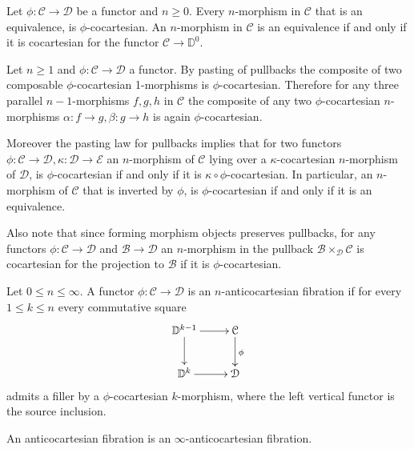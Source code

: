 \documentclass[10pt,oneside]{article}
\numberwithin{equation}{section} %
\numberwithin{figure}{section} %
\theoremstyle{plain}
\theoremstyle{definition}
\newcommand{\bD}{{\mathbb D}}
\newcommand{\mB}{{\mathcal B}}
\newcommand{\mC}{{\mathcal C}}
\newcommand{\mD}{{\mathcal D}}
\newcommand{\mE}{{\mathcal E}}
\begin{document}
\begin{example}Let $\phi: \mC \to \mD$ be a functor and $n \geq 0$.
Every $n$-morphism in $\mC$ that is an equivalence, is $\phi$-cocartesian.
An $n$-morphism in $\mC$ is an equivalence if and only if it is 
cocartesian for the functor $\mC \to \bD^0$.
    
\end{example}

\begin{remark}\label{elemen}
Let $n \geq 1$ and $\phi: \mC \to \mD$ a functor.
By pasting of pullbacks the composite of two composable $\phi$-cocartesian 1-morphisms is $\phi$-cocartesian.
Therefore for any three parallel $n-1$-morphisms $f,g,h$ in $\mC$
the composite of any two $\phi$-cocartesian $n$-morphisms $\alpha : f \to g, \beta: g \to h$ is again $\phi$-cocartesian.

Moreover the pasting law for pullbacks implies that for two functors
$\phi: \mC \to \mD, \kappa: \mD \to \mE$
an $n$-morphism of $\mC$ lying over a $\kappa$-cocartesian $n$-morphism of $\mD$, is $\phi$-cocartesian if and only if it is $\kappa \circ \phi$-cocartesian.
In particular, an $n$-morphism of $\mC$ that is inverted by $\phi$, is $\phi$-cocartesian if and only if it is an equivalence.

Also note that since forming morphism objects preserves pullbacks,
for any functors $\phi:\mC \to \mD$ and $\mB \to \mD$
an $n$-morphism in the pullback $\mB \times_\mD \mC $ is cocartesian for the projection to $\mB$ if it is $\phi$-cocartesian.
    
\end{remark}





\begin{definition} Let $0 \leq n \leq \infty.$
A functor $\phi: \mC \to \mD$ is an $n$-anticocartesian fibration if for every $1 \leq k \leq n$ 
every commutative square 
\begin{equation}\label{filler2}
\begin{xy}
\xymatrix{
\bD^{k-1} \ar[d] \ar[r]
& \mC \ar[d]^\phi
\\ 
\bD^k \ar[r] & \mD
}
\end{xy}\end{equation}
admits a filler by a $\phi$-cocartesian $k$-morphism,
where the left vertical functor is the source inclusion.

An anticocartesian fibration is an $\infty$-anticocartesian fibration.

\end{definition}
\end{document}
